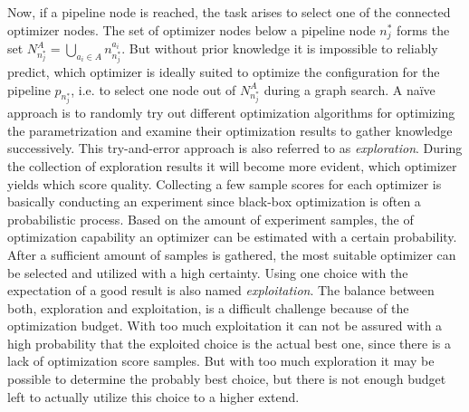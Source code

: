 Now, if a pipeline node is reached, the task arises to select one of the connected optimizer nodes.
The set of optimizer nodes below a pipeline node $n^*_j$ forms the set $N^A_{n^*_j} = \bigcup_{a_i \in A} n^{a_i}_{n^*_j}$.
But without prior knowledge it is impossible to reliably predict, which optimizer is ideally suited to optimize the configuration for the pipeline $p_{n^*_j}$, i.e. to select one node out of $N^A_{n^*_j}$ during a graph search.\newline
A na\"ive approach is to randomly try out different optimization algorithms for optimizing the parametrization and examine their optimization results to gather knowledge successively.
This try-and-error approach is also referred to as \textit{exploration}.
During the collection of exploration results it will become more evident, which optimizer yields which score quality.\newline
Collecting a few sample scores for each optimizer is basically conducting an experiment since black-box optimization is often a probabilistic process.
Based on the amount of experiment samples, the of optimization capability an optimizer can be estimated with a certain probability.
After a sufficient amount of samples is gathered, the most suitable optimizer can be selected and utilized with a high certainty.
Using one choice with the expectation of a good result is also named \textit{exploitation}.\newline
The balance between both, exploration and exploitation, is a difficult challenge because of the optimization budget.
With too much exploitation it can not be assured with a high probability that the exploited choice is the actual best one, since there is a lack of optimization score samples.
But with too much exploration it may be possible to determine the probably best choice, but there is not enough budget left to actually utilize this choice to a higher extend.

